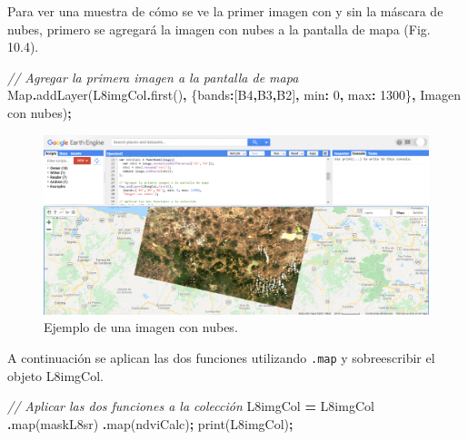 \documentclass[
  12pt,
  letterpaper,
  twoside]{book}
\newenvironment{Shaded}{\begin{snugshade}}{\end{snugshade}}
\newcommand{\BuiltInTok}[1]{#1}
\newcommand{\CommentTok}[1]{\textcolor[rgb]{0.56,0.35,0.01}{\textit{#1}}}
\newcommand{\DataTypeTok}[1]{\textcolor[rgb]{0.13,0.29,0.53}{#1}}
\newcommand{\DecValTok}[1]{\textcolor[rgb]{0.00,0.00,0.81}{#1}}
\newcommand{\FunctionTok}[1]{\textcolor[rgb]{0.00,0.00,0.00}{#1}}
\newcommand{\NormalTok}[1]{#1}
\newcommand{\OperatorTok}[1]{\textcolor[rgb]{0.81,0.36,0.00}{\textbf{#1}}}
\newcommand{\StringTok}[1]{\textcolor[rgb]{0.31,0.60,0.02}{#1}}
\begin{document}
Para ver una muestra de cómo se ve la primer imagen con y sin la máscara de nubes, primero se agregará la imagen con nubes a la pantalla de mapa (Fig. 10.4).

\begin{Shaded}
\begin{Highlighting}[]
\CommentTok{// Agregar la primera imagen a la pantalla de mapa}
\BuiltInTok{Map}\OperatorTok{.}\FunctionTok{addLayer}\NormalTok{(L8imgCol}\OperatorTok{.}\FunctionTok{first}\NormalTok{()}\OperatorTok{,} 
\NormalTok{  \{}\DataTypeTok{bands}\OperatorTok{:}\NormalTok{[}\StringTok{\textquotesingle{}B4\textquotesingle{}}\OperatorTok{,}\StringTok{\textquotesingle{}B3\textquotesingle{}}\OperatorTok{,}\StringTok{\textquotesingle{}B2\textquotesingle{}}\NormalTok{]}\OperatorTok{,} \DataTypeTok{min}\OperatorTok{:} \DecValTok{0}\OperatorTok{,} \DataTypeTok{max}\OperatorTok{:} \DecValTok{1300}\NormalTok{\}}\OperatorTok{,}
  \StringTok{\textquotesingle{}Imagen con nubes\textquotesingle{}}\NormalTok{)}\OperatorTok{;}
\end{Highlighting}
\end{Shaded}

\begin{figure}[btp]

{\centering \includegraphics[width=1\linewidth]{Img/imNubes} 

}

\caption{Ejemplo de una imagen con nubes.}\label{fig:unnamed-chunk-165}
\end{figure}

A continuación se aplican las dos funciones utilizando \texttt{.map} y sobreescribir el objeto L8imgCol.

\begin{Shaded}
\begin{Highlighting}[]
\CommentTok{// Aplicar las dos funciones a la colección}
\NormalTok{L8imgCol }\OperatorTok{=}\NormalTok{ L8imgCol}
  \OperatorTok{.}\FunctionTok{map}\NormalTok{(maskL8sr)}
  \OperatorTok{.}\FunctionTok{map}\NormalTok{(ndviCalc)}\OperatorTok{;}
\FunctionTok{print}\NormalTok{(L8imgCol)}\OperatorTok{;}
\end{Highlighting}
\end{Shaded}
\end{document}
